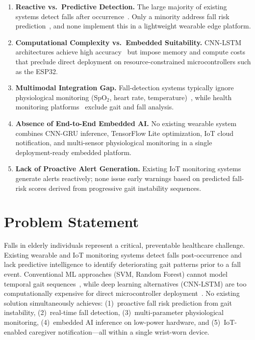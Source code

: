 \documentclass[conference]{IEEEtran}
\begin{document}
\begin{enumerate}
  \item \textbf{Reactive vs.\ Predictive Detection.} The large majority of
        existing systems detect falls after occurrence~\cite{saraubon2018,kumar2024}.
        Only a minority address fall risk prediction~\cite{lim2024,ishaq2026},
        and none implement this in a lightweight wearable edge platform.
  \item \textbf{Computational Complexity vs.\ Embedded Suitability.}
        CNN-LSTM architectures achieve high accuracy~\cite{gaud2025,zhang2025}
        but impose memory and compute costs that preclude direct deployment
        on resource-constrained microcontrollers such as the ESP32.
  \item \textbf{Multimodal Integration Gap.} Fall-detection systems
        typically ignore physiological monitoring (SpO$_2$, heart rate,
        temperature)~\cite{gaud2025,mekruksavanich2022}, while health
        monitoring platforms~\cite{mohammed2022,augastiny2023} exclude gait
        and fall analysis.
  \item \textbf{Absence of End-to-End Embedded AI.} No existing wearable
        system combines CNN-GRU inference, TensorFlow Lite optimization, IoT
        cloud notification, and multi-sensor physiological monitoring in a
        single deployment-ready embedded platform.
  \item \textbf{Lack of Proactive Alert Generation.} Existing IoT monitoring
        systems~\cite{bandara2020,pasrija2025,augastiny2023} generate alerts
        reactively; none issue early warnings based on predicted fall-risk
        scores derived from progressive gait instability sequences.
\end{enumerate}

\section{Problem Statement}
\label{sec:prob}

Falls in elderly individuals represent a critical, preventable healthcare
challenge. Existing wearable and IoT monitoring systems detect falls
post-occurrence and lack predictive intelligence to identify deteriorating
gait patterns prior to a fall event. Conventional ML approaches (SVM,
Random Forest) cannot model temporal gait sequences~\cite{attal2015,kumar2024},
while deep learning alternatives (CNN-LSTM) are too computationally
expensive for direct microcontroller deployment~\cite{gaud2025,zhang2025}.
No existing solution simultaneously achieves: (1)~proactive fall risk
prediction from gait instability, (2)~real-time fall detection,
(3)~multi-parameter physiological monitoring, (4)~embedded AI inference on
low-power hardware, and (5)~IoT-enabled caregiver notification---all within
a single wrist-worn device.
\end{document}
